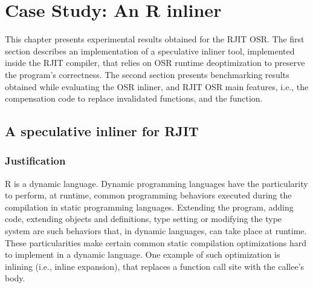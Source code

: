 
\chapter{Case Study: An R inliner} %

\label{Chapter5} %


\newcommand{\keyword}[1]{\textbf{#1}}
\newcommand{\tabhead}[1]{\textbf{#1}}
\newcommand{\code}[1]{\texttt{#1}}
\newcommand{\file}[1]{\texttt{\bfseries#1}}
\newcommand{\option}[1]{\texttt{\itshape#1}}

This chapter presents experimental results obtained for the RJIT OSR.
The first section describes an implementation of a speculative inliner tool, implemented inside the RJIT compiler, that relies on OSR runtime deoptimization to preserve the program's correctness.
The second section presents benchmarking results obtained while evaluating the OSR inliner, and RJIT OSR main features, i.e., the compensation code to replace invalidated functions, and the  function.\\

\section{A speculative inliner for RJIT}
\subsection{Justification}\label{section:justificationinlining}
R is a dynamic language. 
Dynamic programming languages have the particularity to perform, at runtime, common programming behaviors executed during the compilation in static programming languages.
Extending the program, adding code, extending objects and definitions, type setting or modifying the type system are such behaviors that, in dynamic languages, can take place at runtime.
These particularities make certain common static compilation optimizations hard to implement in a dynamic language.
One example of such optimization is inlining (i.e., inline expansion), that replaces a function call site with the callee's body.\\

